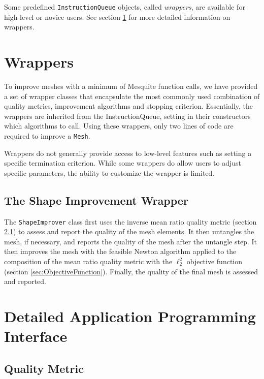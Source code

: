Some predefined \texttt{InstructionQueue} objects, called \emph
{wrappers}, are available for high-level or novice users.  See
section \ref{sec:wrappers} for more detailed information on wrappers.


\section{Wrappers}
\label{sec:wrappers}
To improve meshes with a minimum of Mesquite function calls, we have 
provided a set of wrapper classes that encapsulate the 
most commonly used combination of quality metrics, improvement
algorithms and stopping criterion. Essentially, the wrappers are
inherited from the InstructionQueue, setting in their constructors
which algorithms to call. Using these wrappers, only
two lines of code are required to improve a \texttt{Mesh}.

Wrappers do not generally provide access to low-level features such
as setting a specific termination criterion.  While some wrappers do allow
users to adjust specific parameters, the ability to customize the wrapper
is limited.

\subsection{The Shape Improvement Wrapper}
\label{sec:ShapeImprover}
The \texttt{ShapeImprover} class 
first uses the inverse mean ratio quality
metric (section \ref{sec:QualityMetric}) to assess and report
the quality of the mesh elements. It then untangles the mesh, if
necessary, and reports the quality of the mesh after
the untangle step.  It then improves the mesh with the
feasible Newton algorithm applied to the composition of the mean ratio
quality metric with the $\ell_2^2$ objective function
(section \ref{sec:ObjectiveFunction}). Finally, the quality of the final
mesh is assessed and reported. 


\section{Detailed Application Programming Interface}
\label{sec:detailedAPI}

\subsection{Quality Metric} \label{sec:QualityMetric}


